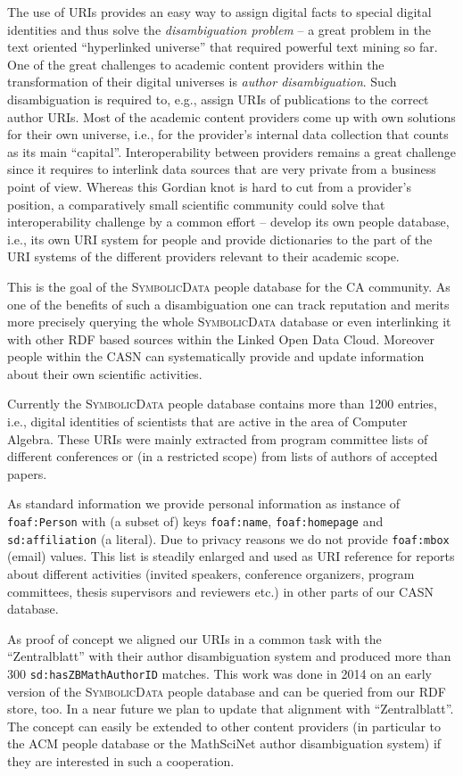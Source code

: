 \documentclass{mathincs}
\newcommand{\SD}{\textsc{Symbo\-lic\-Data}}
\begin{document}
The use of URIs provides an easy way to assign digital facts to special
digital identities and thus solve the \emph{disambiguation problem} -- a great
problem in the text oriented ``hyperlinked universe'' that required powerful
text mining so far.  One of the great challenges to academic content providers
within the transformation of their digital universes is \emph{author
  disambiguation}. Such disambiguation is required to, e.g., assign URIs of
publications to the correct author URIs.  Most of the academic content
providers come up with own solutions for their own universe, i.e., for the
provider's internal data collection that counts as its main ``capital''.
Interoperability between providers remains a great challenge since it requires
to interlink data sources that are very private from a business point of view.
Whereas this Gordian knot is hard to cut from a provider's position, a
comparatively small scientific community could solve that interoperability
challenge by a common effort -- develop its own people database, i.e., its own
URI system for people and provide dictionaries to the part of the URI systems
of the different providers relevant to their academic scope.

This is the goal of the {\SD} people database for the CA community.  As one of
the benefits of such a disambiguation one can track reputation and merits more
precisely querying the whole {\SD} database or even interlinking it with other
RDF based sources within the Linked Open Data Cloud. Moreover people within
the CASN can systematically provide and update information about their own
scientific activities.

Currently the {\SD} people database contains more than 1200 entries, i.e.,
digital identities of scientists that are active in the area of Computer
Algebra.  These URIs were mainly extracted from program committee lists of
different conferences or (in a restricted scope) from lists of authors of
accepted papers.

As standard information we provide personal information as instance of
\texttt{foaf:Person} with (a subset of) keys \texttt{foaf:name},
\texttt{foaf:homepage} and \texttt{sd:affiliation} (a literal). Due to privacy
reasons we do not provide \texttt{foaf:mbox} (email) values.  This list is
steadily enlarged and used as URI reference for reports about different
activities (invited speakers, conference organizers, program committees, thesis
supervisors and reviewers etc.) in other parts of our CASN database.

As proof of concept we aligned our URIs in a common task with the
``Zentralblatt'' with their author disambiguation system and produced more
than 300 \texttt{sd:hasZBMathAuthorID} matches. This work was done in 2014 on
an early version of the {\SD} people database and can be queried from our RDF
store, too.  In a near future we plan to update that alignment with
``Zentralblatt''.  The concept can easily be extended to other content
providers (in particular to the ACM people database or the MathSciNet author
disambiguation system) if they are interested in such a cooperation.
\end{document}
